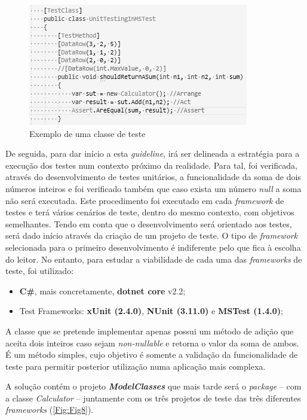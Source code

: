 \begin{figure}[hbt!]
\centering
\includegraphics[width=0.5\linewidth]{Cap5/TestClass.png}
\caption{Exemplo de uma classe de teste}
\label{Fig:Fig7}
\end{figure}

\hspace{1cm}De seguida, para dar início a esta \textit{guideline}, irá ser delineada a estratégia para a execução dos testes num contexto próximo da realidade. Para tal, foi verificada, através do desenvolvimento de testes unitários, a funcionalidade da soma de dois números inteiros e foi verificado também que caso exista um número \textit{null} a soma não será executada. Este procedimento foi executado em cada \textit{framework} de testes e terá vários cenários de teste, dentro do mesmo contexto, com objetivos semelhantes.
\hspace{1cm}Tendo em conta que o desenvolvimento será orientado aos testes, será dado início através da criação de um projeto de teste. O tipo de \textit{framework} selecionada para o primeiro desenvolvimento é indiferente pelo que fica à escolha do leitor. No entanto, para estudar a viabilidade de cada uma das \textit{frameworks} de teste, foi utilizado:
\begin{itemize} 
  \item \textbf{C\#}, mais concretamente, \textbf{dotnet core} v2.2;
  \item Test Frameworks: \textbf{xUnit (2.4.0)}, \textbf{NUnit (3.11.0)} e \textbf{MSTest (1.4.0)};
\end{itemize}

\hspace{1cm}A classe que se pretende implementar apenas possui um método de adição que aceita dois inteiros caso sejam \textit{non-nullable} e retorna o valor da soma de ambos. É um método simples, cujo objetivo é somente a validação da funcionalidade de teste para permitir posterior utilização numa aplicação mais complexa.

\hspace{1cm}A solução contém o projeto \textbf{\textit{ModelClasses}} que mais tarde será o \textit{package} -- com a classe \textit{Calculator} -- juntamente com os três projetos de teste das três diferentes \textit{frameworks} (\ref{Fig:Fig8}).

